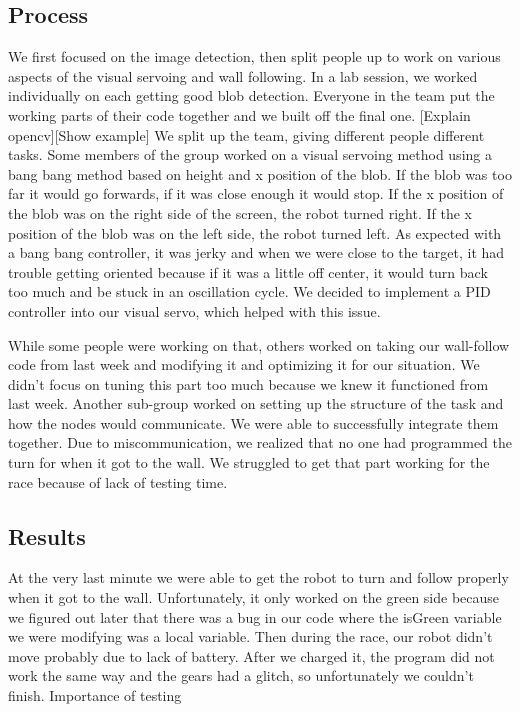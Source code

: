 \documentclass[journal, a4paper]{IEEEtran}
\begin{document}
\subsection{Process}
\par We first focused on the image detection, then split people up to work on various aspects of the visual servoing and wall following. In a lab session, we worked individually on each getting good blob detection. Everyone in the team put the working parts of their code together and we built off the final one. [Explain opencv][Show example] We split up the team, giving different people different tasks. Some members of the group worked on a visual servoing method using a bang bang method based on height and x position of the blob. If the blob was too far it would go forwards, if it was close enough it would stop. If the x position of the blob was on the right side of the screen, the robot turned right. If the x position of the blob was on the left side, the robot turned left. As expected with a bang bang controller, it was jerky and when we were close to the target, it had trouble getting oriented because if it was a little off center, it would turn back too much and be stuck in an oscillation cycle. We decided to implement a PID controller into our visual servo, which helped with this issue. 
\par While some people were working on that, others worked on taking our wall-follow code from last week and modifying it and optimizing it for our situation. We didn’t focus on tuning this part too much because we knew it functioned from last week. Another sub-group worked on setting up the structure of the task and how the nodes would communicate. We were able to successfully integrate them together. Due to miscommunication, we realized that no one had programmed the turn for when it got to the wall. We struggled to get that part working for the race because of lack of testing time. 
\subsection{Results}
At the very last minute we were able to get the robot to turn and follow properly when it got to the wall. Unfortunately, it only worked on the green side because we figured out later that there was a bug in our code where the isGreen variable we were modifying was a local variable. Then during the race, our robot didn’t move probably due to lack of battery. After we charged it, the program did not work the same way and the gears had a glitch, so unfortunately we couldn’t finish. Importance of testing
\end{document}
